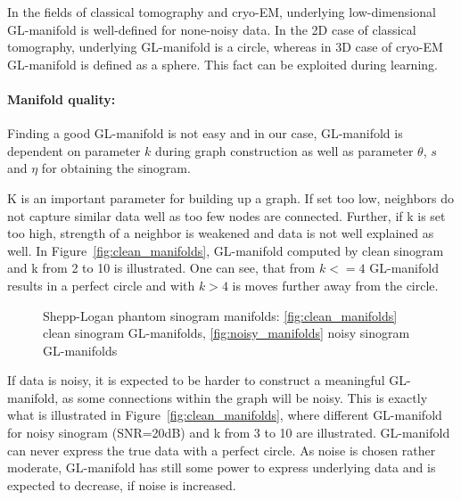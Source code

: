 \begin{tcolorbox}[colback=red!5!white,colframe=red!75!black]
    In the fields of classical tomography and cryo-EM, underlying low-dimensional GL-manifold is well-defined for none-noisy data.
    In the 2D case of classical tomography, underlying GL-manifold is a circle, whereas in 3D case of cryo-EM  GL-manifold
    is defined as a sphere.
    This fact can be exploited during learning.
\end{tcolorbox}

\paragraph{Manifold quality:}

Finding a good GL-manifold is not easy and in our case, GL-manifold is dependent on parameter $k$ during graph construction
as well as parameter $\theta$, $s$ and $\eta$ for obtaining the sinogram.

K is an important parameter for building up a graph. If set too low, neighbors
do not capture similar data well as too few nodes are connected. 
Further, if k is set too high, strength of a neighbor 
is weakened and data is not well explained as well.
In Figure~\ref{fig:clean_manifolds}, GL-manifold computed by clean sinogram and k from 2 to 10 is illustrated.
One can see, that from $k <= 4$ GL-manifold results in a perfect circle and with $k >  4$ is moves 
further away from the circle. 


\begin{figure}[H]
    \centering
    \hfill
    \hfill
    \hfill
    \caption{Shepp-Logan phantom sinogram manifolds:
    \ref{fig:clean_manifolds} clean sinogram GL-manifolds,
    \ref{fig:noisy_manifolds} noisy sinogram GL-manifolds}
\end{figure}

If data is noisy, it is expected to be harder to construct a meaningful GL-manifold, as some connections within
the graph will be noisy. This is exactly what is illustrated in Figure~\ref{fig:clean_manifolds}, where 
different GL-manifold for noisy sinogram (SNR=20dB) and k from 3 to 10 are illustrated.
GL-manifold can never express the true data with a perfect circle. As noise is chosen rather moderate, GL-manifold has still some 
power to express underlying data and is expected to decrease, if noise is increased.


